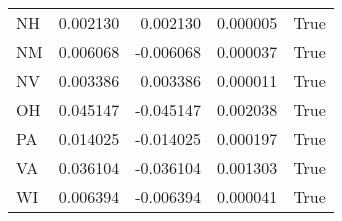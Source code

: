 \begin{table}
\begin{tabular}{lrrrl}
      NH &   0.002130 &  0.002130 &       0.000005 &          True \\
      NM &   0.006068 & -0.006068 &       0.000037 &          True \\
      NV &   0.003386 &  0.003386 &       0.000011 &          True \\
      OH &   0.045147 & -0.045147 &       0.002038 &          True \\
      PA &   0.014025 & -0.014025 &       0.000197 &          True \\
      VA &   0.036104 & -0.036104 &       0.001303 &          True \\
      WI &   0.006394 & -0.006394 &       0.000041 &          True \\
\bottomrule
\end{tabular}
\end{table}
